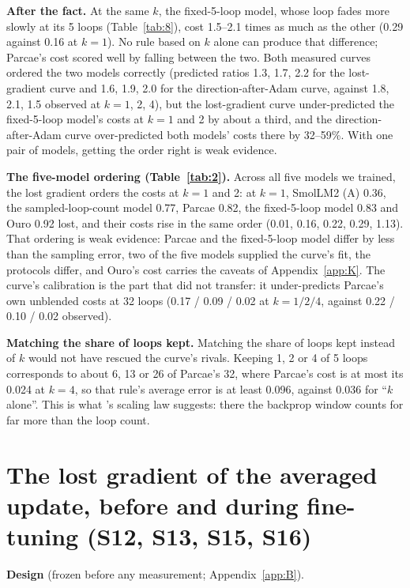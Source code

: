 \documentclass[10pt]{article}
\begin{document}
\textbf{After the fact.} At the same $k$, the fixed-5-loop model, whose loop fades more slowly at its 5 loops (Table~\ref{tab:8}), cost 1.5--2.1 times as much as the other (0.29 against 0.16 at $k = 1$). No rule based on $k$ alone can produce that difference; Parcae's cost scored well by falling between the two. Both measured curves ordered the two models correctly (predicted ratios 1.3, 1.7, 2.2 for the lost-gradient curve and 1.6, 1.9, 2.0 for the direction-after-Adam curve, against 1.8, 2.1, 1.5 observed at $k = 1$, 2, 4), but the lost-gradient curve under-predicted the fixed-5-loop model's costs at $k = 1$ and 2 by about a third, and the direction-after-Adam curve over-predicted both models' costs there by 32--59\%. With one pair of models, getting the order right is weak evidence.

\textbf{The five-model ordering (Table~\ref{tab:2}).} Across all five models we trained, the lost gradient orders the costs at $k = 1$ and 2: at $k = 1$, SmolLM2 (A) 0.36, the sampled-loop-count model 0.77, Parcae 0.82, the fixed-5-loop model 0.83 and Ouro 0.92 lost, and their costs rise in the same order (0.01, 0.16, 0.22, 0.29, 1.13). That ordering is weak evidence: Parcae and the fixed-5-loop model differ by less than the sampling error, two of the five models supplied the curve's fit, the protocols differ, and Ouro's cost carries the caveats of Appendix~\ref{app:K}. The curve's calibration is the part that did not transfer: it under-predicts Parcae's own unblended costs at 32 loops (0.17 / 0.09 / 0.02 at $k = 1 / 2 / 4$, against 0.22 / 0.10 / 0.02 observed).

\textbf{Matching the share of loops kept.} Matching the share of loops kept instead of $k$ would not have rescued the curve's rivals. Keeping 1, 2 or 4 of 5 loops corresponds to about 6, 13 or 26 of Parcae's 32, where Parcae's cost is at most its 0.024 at $k = 4$, so that rule's average error is at least 0.096, against 0.036 for ``$k$ alone''. This is what \citet{xiong2026truncate}'s scaling law suggests: there the backprop window counts for far more than the loop count.

\section{The lost gradient of the averaged update, before and during fine-tuning (S12, S13, S15, S16)}\label{app:I}

\textbf{Design} (frozen before any measurement; Appendix~\ref{app:B}).
\end{document}
